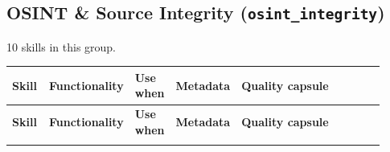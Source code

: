 \documentclass[
]{article}
\renewcommand{\arraystretch}{1.08}
\begin{document}
\subsection{\texorpdfstring{OSINT \& Source Integrity
(\texttt{osint\_integrity})}{OSINT & Source Integrity (osint_integrity)}}\label{osint-source-integrity-osint_integrity}

10 skills in this group.

\begingroup
\scriptsize
\setlength{\tabcolsep}{1.8pt}
\renewcommand{\arraystretch}{1.02}
\begin{longtable}{@{}>{\raggedright\arraybackslash}p{0.105\linewidth}>{\raggedright\arraybackslash}p{0.13\linewidth}>{\raggedright\arraybackslash}p{0.095\linewidth}>{\raggedright\arraybackslash}p{0.135\linewidth}>{\raggedright\arraybackslash}p{0.455\linewidth}@{}}
\toprule
\textbf{Skill} & \textbf{Functionality} & \textbf{Use when} & \textbf{Metadata} & \textbf{Quality capsule}\\
\midrule
\endfirsthead
\toprule
\textbf{Skill} & \textbf{Functionality} & \textbf{Use when} & \textbf{Metadata} & \textbf{Quality capsule}\\
\midrule
\endhead
\bottomrule
\endfoot

\end{longtable}
\end{document}
